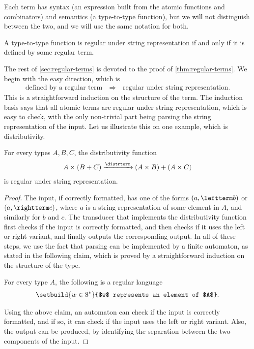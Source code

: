 Each term has syntax (an expression built from the atomic functions and combinators) and semantics (a type-to-type function), but we will not distinguish between the two, and we will use the same notation for both. 

\begin{theorem}\label{thm:regular-terms} A type-to-type function is regular under string representation if and only if it is defined by some regular term.
\end{theorem}

The rest of \cref{sec:regular-terms} is devoted to the proof of \cref{thm:regular-terms}.  We begin with the easy direction, which is
\begin{align*}
\text{defined by a regular term} 
\quad \Rightarrow \quad 
\text{regular under string representation.}
\end{align*}
This is a straightforward induction on the structure of the term. The induction basis says that all atomic terms are regular under string representation, which is easy to check, with the only  non-trivial part being  parsing the string representation of the input. Let us illustrate this on one example, which is distributivity.

\begin{lemma}
    For every types $A,B,C$, the distributivity function
    \begin{align*}
    A \times (B + C) \xrightarrow {\distrterm} (A \times B) + (A \times C)
    \end{align*}
    is regular under string representation.
\end{lemma}
\begin{proof}
    The input, if correctly formatted, has one of the forms $(a, \leftterm b)$ or $(a, \rightterm c)$, where $a$ is a string representation of some element in $A$, and similarly for $b$ and $c$.      The transducer that implements the distributivity function first checks if the input is correctly formatted, and then checks if it uses the left or right variant, and finally outputs the corresponding output. In all of these steps, we use the fact that parsing can be implemented by a finite automaton, as stated in the following claim, which is proved by a straightforward induction on the structure of the type. 
        \begin{claim}
        For every type $A$, the following is a regular language
        \begin{align*}
        \setbuild{ w \in 8^*}{$w$ represents an element of $A$}.
        \end{align*}
    \end{claim}
    Using the above claim, an automaton can check if the input is correctly formatted, and if so, it can check if the input uses the left or right variant. Also, the output can be produced, by identifying the separation between the two components of the input. 
\end{proof}

